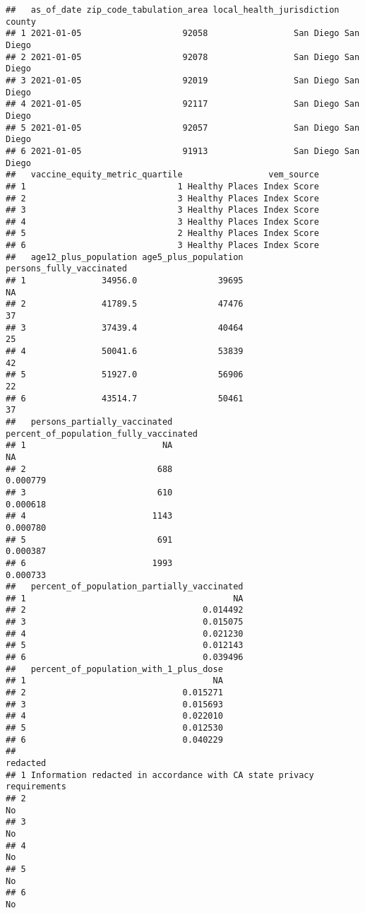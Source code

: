 \documentclass[
]{article}
\begin{document}
\begin{verbatim}
##   as_of_date zip_code_tabulation_area local_health_jurisdiction    county
## 1 2021-01-05                    92058                 San Diego San Diego
## 2 2021-01-05                    92078                 San Diego San Diego
## 3 2021-01-05                    92019                 San Diego San Diego
## 4 2021-01-05                    92117                 San Diego San Diego
## 5 2021-01-05                    92057                 San Diego San Diego
## 6 2021-01-05                    91913                 San Diego San Diego
##   vaccine_equity_metric_quartile                 vem_source
## 1                              1 Healthy Places Index Score
## 2                              3 Healthy Places Index Score
## 3                              3 Healthy Places Index Score
## 4                              3 Healthy Places Index Score
## 5                              2 Healthy Places Index Score
## 6                              3 Healthy Places Index Score
##   age12_plus_population age5_plus_population persons_fully_vaccinated
## 1               34956.0                39695                       NA
## 2               41789.5                47476                       37
## 3               37439.4                40464                       25
## 4               50041.6                53839                       42
## 5               51927.0                56906                       22
## 6               43514.7                50461                       37
##   persons_partially_vaccinated percent_of_population_fully_vaccinated
## 1                           NA                                     NA
## 2                          688                               0.000779
## 3                          610                               0.000618
## 4                         1143                               0.000780
## 5                          691                               0.000387
## 6                         1993                               0.000733
##   percent_of_population_partially_vaccinated
## 1                                         NA
## 2                                   0.014492
## 3                                   0.015075
## 4                                   0.021230
## 5                                   0.012143
## 6                                   0.039496
##   percent_of_population_with_1_plus_dose
## 1                                     NA
## 2                               0.015271
## 3                               0.015693
## 4                               0.022010
## 5                               0.012530
## 6                               0.040229
##                                                                redacted
## 1 Information redacted in accordance with CA state privacy requirements
## 2                                                                    No
## 3                                                                    No
## 4                                                                    No
## 5                                                                    No
## 6                                                                    No
\end{verbatim}
\end{document}
